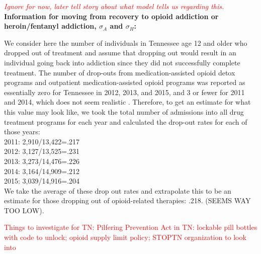 \documentclass[12pt]{article}
\begin{document}
\begin{itemize}
\textcolor{red}{\emph{Ignore for now, later tell story about what model tells us regarding this.}} \\
\textbf{Information for moving from recovery to opioid addiction or heroin/fentanyl addiction, $\sigma_A$ and $\sigma_H$:} 

We consider here the number of individuals in Tennessee age 12 and older who dropped out of treatment and assume that dropping out would result in an individual going back into addiction since they did not successfully complete treatment. The number of drop-outs from medication-assisted opioid detox programs and outpatient medication-assisted opioid programs was reported as essentially zero for Tennessee in 2012, 2013, and 2015, and 3 or fewer for 2011 and 2014, which does not seem realistic \cite{TEDS2011_SAMSHA_discharges, TEDS2012_SAMSHA_discharges, TEDS2013_SAMSHA_discharges, TEDS2014_SAMSHA_discharges, TEDS2015_SAMSHA_discharges}. Therefore, to get an estimate for what this value may look like, we took the total number of admissions into all drug treatment programs for each year and calculated the drop-out rates for each of those years: \\
2011: 2,910/13,422=.217  \cite{TEDS2011_SAMSHA_admissions,TEDS2011_SAMSHA_discharges} \\
2012: 3,127/13,525=.231 \cite{TEDS2012_SAMSHA_admissions, TEDS2012_SAMSHA_discharges} \\
2013: 3,273/14,476=.226 \cite{TEDS2013_SAMSHA_admissions, TEDS2013_SAMSHA_discharges} \\
2014: 3,164/14,909=.212  \cite{TEDS2014_SAMSHA_admissions, TEDS2014_SAMSHA_discharges} \\
2015:  3,039/14,916=.204 \cite{TEDS2015_SAMSHA_admissions, TEDS2015_SAMSHA_discharges} \\

We take the average of these drop out rates and extrapolate this to be an estimate for those dropping out of opioid-related therapies: .218. (SEEMS WAY TOO LOW).



\end{itemize}


\textcolor{red}{Things to investigate for TN: Pilfering Prevention Act in TN: lockable pill bottles with code to unlock; opioid supply limit policy; STOPTN organization to look into} 


\end{document}

